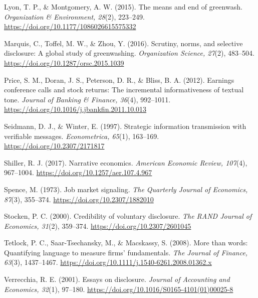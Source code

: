 Lyon, T. P., \& Montgomery, A. W. (2015). The means and end of greenwash. \textit{Organization \& Environment, 28}(2), 223--249. \url{https://doi.org/10.1177/1086026615575332}

Marquis, C., Toffel, M. W., \& Zhou, Y. (2016). Scrutiny, norms, and selective disclosure: A global study of greenwashing. \textit{Organization Science, 27}(2), 483--504. \url{https://doi.org/10.1287/orsc.2015.1039}

Price, S. M., Doran, J. S., Peterson, D. R., \& Bliss, B. A. (2012). Earnings conference calls and stock returns: The incremental informativeness of textual tone. \textit{Journal of Banking \& Finance, 36}(4), 992--1011. \url{https://doi.org/10.1016/j.jbankfin.2011.10.013}

Seidmann, D. J., \& Winter, E. (1997). Strategic information transmission with verifiable messages. \textit{Econometrica, 65}(1), 163--169. \url{https://doi.org/10.2307/2171817}

Shiller, R. J. (2017). Narrative economics. \textit{American Economic Review, 107}(4), 967--1004. \url{https://doi.org/10.1257/aer.107.4.967}

Spence, M. (1973). Job market signaling. \textit{The Quarterly Journal of Economics, 87}(3), 355--374. \url{https://doi.org/10.2307/1882010}

Stocken, P. C. (2000). Credibility of voluntary disclosure. \textit{The RAND Journal of Economics, 31}(2), 359--374. \url{https://doi.org/10.2307/2601045}

Tetlock, P. C., Saar-Tsechansky, M., \& Macskassy, S. (2008). More than words: Quantifying language to measure firms’ fundamentals. \textit{The Journal of Finance, 63}(3), 1437--1467. \url{https://doi.org/10.1111/j.1540-6261.2008.01362.x}

Verrecchia, R. E. (2001). Essays on disclosure. \textit{Journal of Accounting and Economics, 32}(1), 97--180. \url{https://doi.org/10.1016/S0165-4101(01)00025-8}

\endgroup